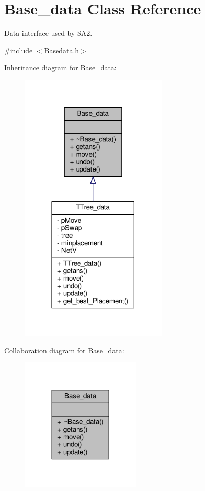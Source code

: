 \hypertarget{classBase__data}{}\section{Base\+\_\+data Class Reference}
\label{classBase__data}


Data interface used by S\+A2.  




{\ttfamily \#include $<$Basedata.\+h$>$}



Inheritance diagram for Base\+\_\+data\+:
\nopagebreak
\begin{figure}[H]
\begin{center}
\leavevmode
\includegraphics[width=201pt]{classBase__data__inherit__graph}
\end{center}
\end{figure}


Collaboration diagram for Base\+\_\+data\+:
\nopagebreak
\begin{figure}[H]
\begin{center}
\leavevmode
\includegraphics[width=164pt]{classBase__data__coll__graph}
\end{center}
\end{figure}
